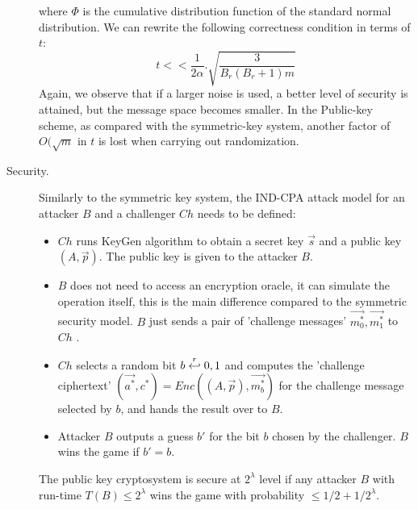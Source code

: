 \begin{description}
\[  \]
  where $\Phi$ is the cumulative distribution function of the standard normal
  distribution. We can rewrite the following correctness condition in terms of
  $t$:
  \[
    t << \frac{1}{2\alpha}.\sqrt{\frac{3}{B_r(B_r + 1)m}}
  \]
Again, we observe that if a larger noise is used, a better level of security is attained,
  but the message space becomes smaller. In the Public-key scheme, as compared with
  the symmetric-key system, another factor of $O(\sqrt{m}$ in $t$ is lost when carrying out randomization.
\item [Security.] Similarly to the symmetric key system, the
  IND-CPA attack model for an attacker $B$ and a challenger $Ch$ needs to be defined:
  \begin{itemize}
  \item $Ch$ runs KeyGen algorithm to obtain a secret key $\vec{s}$ and a public
    key $(A,\vec{p})$. The public key is given to the attacker $B$.
  \item $B$ does not need to access an encryption oracle, it can simulate the
    operation itself, this is the main difference compared to the symmetric
    security model. $B$ just sends a pair of 'challenge messages'
    $\vec{m_0^*}, \vec{m_1^*}$ to $Ch$ .
  \item $Ch$ selects a random bit $b \stackrel{r}{\hookleftarrow} {0,1}$ and computes the
    'challenge ciphertext' $(\vec{a^*}, c^*) = Enc((A, \vec{p}), \vec{m_b^*})$
    for the challenge message selected by $b$, and hands the result over to $B$.
  \item Attacker $B$ outputs a guess $b'$ for the bit $b$ chosen by the
    challenger. $B$ wins the game if $b' = b$.
  \end{itemize}
  \begin{definition}
     The public key cryptosystem is secure at
    $2^\lambda$ level if any attacker $B$ with run-time $T(B) \leq 2^\lambda$
    wins the game with probability $\leq 1/2 + 1/2^\lambda$.

    \label{def:PublicKeyIndCPARegev}
  \end{definition}


\end{description}
